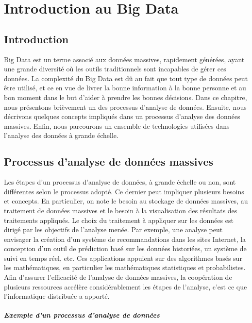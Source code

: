 \chapter{Introduction au Big Data} \label{chap:big-data-intro}
	
	\section{Introduction}
		Big Data est un terme associé aux données massives, rapidement générées, ayant une grande diversité où les  outils traditionnels sont incapables de gérer ces données. La complexité du Big Data est dû au  fait que tout type de données peut être utilisé, et ce en vue de livrer la bonne information à la bonne personne et au bon moment dans le but d'aider à prendre les bonnes décisions. Dans ce chapitre, nous  présentons brièvement un des processus d'analyse de données. Ensuite, nous décrivons quelques concepts impliqués dans un processus d'analyse des données massives. Enfin, nous parcourons un ensemble de technologies utilisées dans l'analyse des données à grande échelle.
			
	\section{Processus d'analyse de données massives}
	
Les étapes d'un processus d'analyse de données, à grande échelle ou non, sont différentes selon le processus adopté.  Ce dernier peut impliquer plusieurs besoins et concepts. En particulier, on note le besoin au stockage de données massives, au traitement de données massives et le besoin à la visualisation des résultats des traitements appliqués. Le choix du traitement à appliquer sur les données est dirigé par les objectifs de  l'analyse menée. Par exemple, une analyse peut envisager la création d'un système de recommandations dans les sites Internet, la conception d'un outil de prédiction basé sur les données historiées, un système de suivi en temps réel, etc.  Ces applications appuient sur des algorithmes basés sur les mathématiques, en particulier les mathématiques statistiques et probabilistes. Afin d'assurer l'efficacité de l'analyse de données massives, la coopération de plusieurs ressources accélère considérablement les étapes de l'analyse, c'est ce que l'informatique distribuée a apporté.


\paragraph{Exemple d'un  processus d'analyse de données} \label{sec:process-data-analysis}~

